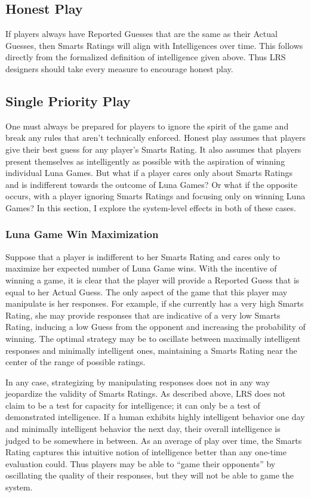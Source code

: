 \subsection{Honest Play}

If players always have Reported Guesses that are the same as their Actual Guesses, then Smarts Ratings will align with Intelligences over time. This follows directly from the formalized definition of intelligence given above. Thus LRS designers should take every measure to encourage honest play.

\subsection{Single Priority Play}

One must always be prepared for players to ignore the spirit of the game and break any rules that aren't technically enforced. Honest play assumes that players give their best guess for any player's Smarts Rating. It also assumes that players present themselves as intelligently as possible with the aspiration of winning individual Luna Games. But what if a player cares only about Smarts Ratings and is indifferent towards the outcome of Luna Games? Or what if the opposite occurs, with a player ignoring Smarts Ratings and focusing only on winning Luna Games? In this section, I explore the system-level effects in both of these cases.

\subsubsection{Luna Game Win Maximization}

Suppose that a player is indifferent to her Smarts Rating and cares only to maximize her expected number of Luna Game wins. With the incentive of winning a game, it is clear that the player will provide a Reported Guess that is equal to her Actual Guess. The only aspect of the game that this player may manipulate is her responses. For example, if she currently has a very high Smarts Rating, she may provide responses that are indicative of a very low Smarts Rating, inducing a low Guess from the opponent and increasing the probability of winning. The optimal strategy may be to oscillate between maximally intelligent responses and minimally intelligent ones, maintaining a Smarts Rating near the center of the range of possible ratings. 

In any case, strategizing by manipulating responses does not in any way jeopardize the validity of Smarts Ratings. As described above, LRS does not claim to be a test for capacity for intelligence; it can only be a test of demonstrated intelligence. If a human exhibits highly intelligent behavior one day and minimally intelligent behavior the next day, their overall intelligence is judged to be somewhere in between. As an average of play over time, the Smarts Rating captures this intuitive notion of intelligence better than any one-time evaluation could. Thus players may be able to ``game their opponents'' by oscillating the quality of their responses, but they will not be able to game the system.

